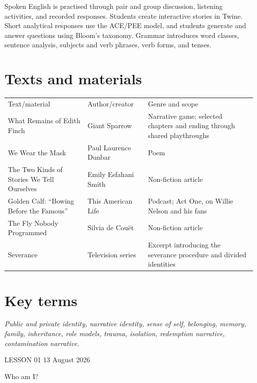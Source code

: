 \documentclass[11pt,a4paper,oneside]{book}
\begin{document}
Spoken English is practised through pair and group discussion, listening activities, and recorded responses. Students create interactive stories in Twine. Short analytical responses use the ACE/PEE model, and students generate and answer questions using Bloom's taxonomy. Grammar introduces word classes, sentence analysis, subjects and verb phrases, verb forms, and tenses.


\section*{Texts and materials}

{\small\setlength{\tabcolsep}{4pt}\renewcommand{\arraystretch}{1.15}\begin{tabularx}{\linewidth}{@{}>{\raggedright\arraybackslash}X>{\raggedright\arraybackslash}X>{\raggedright\arraybackslash}X@{}}\toprule
Text/material & Author/creator & Genre and scope\\
What Remains of Edith Finch & Giant Sparrow & Narrative game; selected chapters and ending through shared playthroughs\\
We Wear the Mask & Paul Laurence Dunbar & Poem\\
The Two Kinds of Stories We Tell Ourselves & Emily Esfahani Smith & Non-fiction article\\
Golden Calf: “Bowing Before the Famous” & This American Life & Podcast; Act One, on Willie Nelson and his fans\\
The Fly Nobody Programmed & Silvia de Couët & Non-fiction article\\
Severance & Television series & Excerpt introducing the severance procedure and divided identities\\
\bottomrule\end{tabularx}}\par\medskip

\section*{Key terms}
\emph{Public and private identity, narrative identity, sense of self, belonging, memory, family, inheritance, role models, trauma, isolation, redemption narrative, contamination narrative.}

\par\endgroup\clearpage

\clearpage{}
{\color{blue}\small LESSON 01 \hfill 13 August 2026\par}
\vspace{4mm}
{\displayfont\color{navy}\fontsize{30}{34}\selectfont Who am I?\par}\vspace{4mm}
\end{document}
